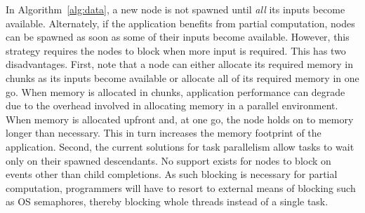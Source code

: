\documentclass[10pt,conference]{IEEEtran}
\begin{document}
%
%
In Algorithm~\ref{alg:data}, a new node is not spawned until \textit{all} its
inputs become available. Alternately, if the application benefits from partial
computation, nodes can be spawned as soon as some of their inputs become
available. However, this strategy requires the nodes to block when more input
is required.  This has two disadvantages.  
%
First, note that a node can either allocate its required memory in chunks as
its inputs become available or allocate all of its required memory in one go.
When memory is allocated in chunks, application performance can degrade due to
the overhead involved in allocating memory in a parallel environment. When
memory is allocated upfront and, at one go, the node holds on to memory longer than
necessary. This in turn increases the memory footprint of the application.
%
Second,  the current solutions for task parallelism allow tasks to wait only on
their spawned descendants. No support exists for nodes to block on events other
than child completions. As such blocking is necessary for partial computation,
programmers will have to resort to external means of blocking such as OS
semaphores, thereby blocking whole threads instead of a single task.
\end{document}
